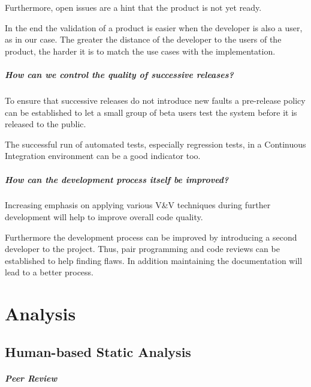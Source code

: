 \documentclass{scrreprt}
\begin{document}
Furthermore, open issues are a hint that the product is not yet ready.

In the end the validation of a product is easier when the developer is also a user, as in our case. The greater the distance of the developer to the users of the product, the harder it is to match the use cases with the implementation. 

\paragraph{How can we control the quality of successive releases?}

To ensure that successive releases do not introduce new faults a pre-release policy can be established to let a small group of beta users test the system before it is released to the public.

The successful run of automated tests, especially regression tests, in a Continuous Integration environment can be a good indicator too.

\paragraph{How can the development process itself be improved?}

Increasing emphasis on applying various V\&V techniques during further development will help to improve overall code quality. 

Furthermore the development process can be improved by introducing a second developer to the project. Thus, pair programming and code reviews can be established to help finding flaws. In addition maintaining the documentation will lead to a better process.


\chapter{Analysis}

\section{Human-based Static Analysis}

\paragraph{Peer Review}
\end{document}
